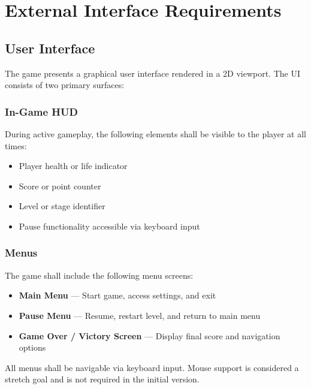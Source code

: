 \documentclass[12pt, letterpaper]{article}
\begin{document}
\newpage

\section{External Interface Requirements}

\subsection{User Interface}

The game presents a graphical user interface rendered in a 2D viewport. The UI consists of two primary surfaces:

\subsubsection{In-Game HUD}

During active gameplay, the following elements shall be visible to the player at all times:

\begin{itemize}[noitemsep]
    \item Player health or life indicator
    \item Score or point counter
    \item Level or stage identifier
    \item Pause functionality accessible via keyboard input
\end{itemize}

\subsubsection{Menus}

The game shall include the following menu screens:

\begin{itemize}[noitemsep]
    \item \textbf{Main Menu} — Start game, access settings, and exit
    \item \textbf{Pause Menu} — Resume, restart level, and return to main menu
    \item \textbf{Game Over / Victory Screen} — Display final score and navigation options
\end{itemize}

All menus shall be navigable via keyboard input. Mouse support is considered a stretch goal and is not required in the initial version.
\end{document}
